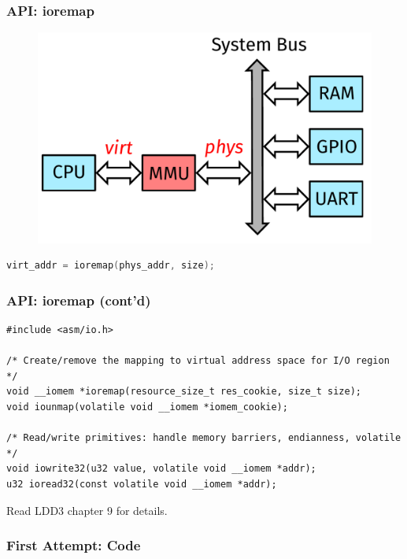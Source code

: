 \begin{frame}[containsverbatim]
  \frametitle{API: ioremap}
  \begin{figure}
    \centering
    \includegraphics[scale=0.3]{images/phys-virt-ioremap.pdf}
  \end{figure}

  \begin{lstlisting}[language=c,numbers=none]
virt_addr = ioremap(phys_addr, size);
  \end{lstlisting}
\end{frame}

\begin{frame}[containsverbatim]
  \frametitle{API: ioremap (cont'd)}
  \begin{lstlisting}[style=c,numbers=none]
#include <asm/io.h>

/* Create/remove the mapping to virtual address space for I/O region */
void __iomem *ioremap(resource_size_t res_cookie, size_t size);
void iounmap(volatile void __iomem *iomem_cookie);

/* Read/write primitives: handle memory barriers, endianness, volatile */
void iowrite32(u32 value, volatile void __iomem *addr);
u32 ioread32(const volatile void __iomem *addr);
  \end{lstlisting}

  Read LDD3 chapter 9 for details.
\end{frame}

\begin{frame}[containsverbatim,allowframebreaks=1]
  \frametitle{First Attempt: Code}
  
\end{frame}

